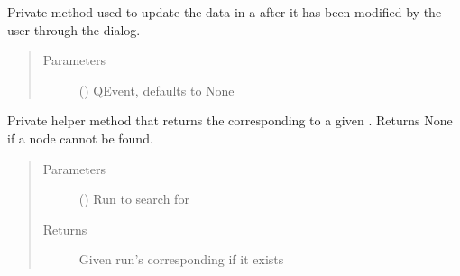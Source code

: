 \documentclass[letterpaper,10pt,english]{sphinxmanual}
\begin{document}
\begin{fulllineitems}
\begin{fulllineitems}
\label{\detokenize{polo.widgets:polo.widgets.run_tree.RunTree._edit_data_slot}}
Private method used to update the data in a  after it has
been modified by the user through the  dialog.
\begin{quote}\begin{description}
\item[{Parameters}] \leavevmode
{} (\sphinxstyleliteralemphasis{\sphinxupquote{, }}) \textendash{} QEvent, defaults to None

\end{description}\end{quote}

\end{fulllineitems}


\begin{fulllineitems}
\label{\detokenize{polo.widgets:polo.widgets.run_tree.RunTree._get_run_node}}
Private helper method that returns the 
corresponding to a given . Returns None if a node cannot be found.
\begin{quote}\begin{description}
\item[{Parameters}] \leavevmode
{} ({\hyperref[\detokenize{polo.crystallography:polo.crystallography.run.Run}]{}}) \textendash{} Run to search for

\item[{Returns}] \leavevmode
Given run’s corresponding  if it exists


\end{description}
\end{quote}
\end{fulllineitems}
\end{fulllineitems}
\end{document}
